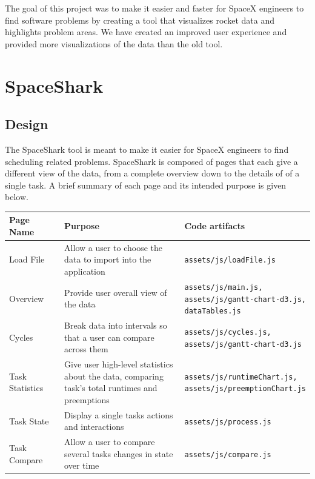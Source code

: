 \documentclass{hmcclinic}
\begin{document}
The goal of this project was to make it easier and faster for SpaceX engineers
to find software problems by creating a tool that visualizes rocket data and
highlights problem areas. We have created an improved user experience and
provided more visualizations of the data than the old tool. 
\chapter{SpaceShark}
\section{Design} %

  The SpaceShark tool is meant to make it easier for SpaceX engineers to find
  scheduling related problems.  SpaceShark is composed of pages that each give a
  different view of the data, from a complete overview down to the details of
  of a single task. A brief summary of each page and its intended purpose is
  given below.

  \begin{center}
    \begin{tabular}{p{0.2\linewidth}p{0.5\linewidth}p{0.3\linewidth}}
     \toprule
      Page Name       & Purpose & Code artifacts     \\
      \midrule
      Load File       & Allow a user to choose the data to import into the
      application        & \texttt{assets/js/loadFile.js}\\
      Overview        & Provide user overall view of the data        &
      \texttt{assets/js/main.js, assets/js/gantt-chart-d3.js, dataTables.js}\\
      Cycles          & Break data into intervals so that a user can compare
      across them        & \texttt{assets/js/cycles.js,
      assets/js/gantt-chart-d3.js}\\
      Task Statistics & Give user high-level statistics about the data,
      comparing task's total runtimes and preemptions        &
      \texttt{assets/js/runtimeChart.js, assets/js/preemptionChart.js}\\
      Task State      & Display a single tasks actions and interactions
      & \texttt{assets/js/process.js}\\
      Task Compare    & Allow a user to compare several tasks changes in state
      over time     & \texttt{assets/js/compare.js}\\
    \bottomrule
    \end{tabular}
  \end{center}
\end{document}
